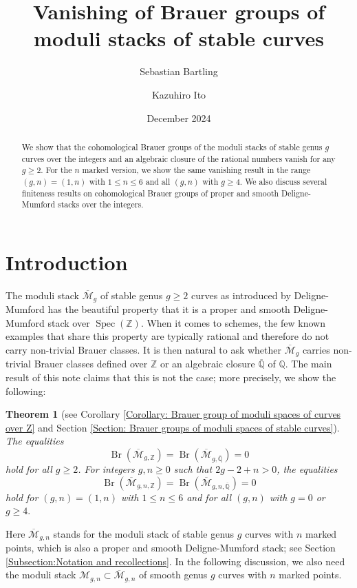 \documentclass{amsart}
\title{Vanishing of Brauer groups of moduli stacks of stable curves}
\author{Sebastian Bartling}
\author{Kazuhiro Ito}
\date{December 2024}
\newtheorem{thm}[prop]{Theorem}
\theoremstyle{definition}
\theoremstyle{remark}
\DeclareMathOperator{\Spec}{Spec}
\DeclareMathOperator{\Br}{Br}
\newcommand{\Q}{\mathbb{Q}}
\newcommand{\ZZ}{\mathbb Z}
\newcommand{\QQ}{\mathbb Q}
\begin{document}
\begin{abstract}
    We show that the cohomological Brauer groups of
    the moduli stacks of stable genus $g$ curves over the integers and an algebraic closure of the rational numbers vanish for any $g\geq 2$.
    For the $n$ marked version, we show the same vanishing result in the range $(g,n)=(1,n)$ with $1\leq n \leq 6$ and all $(g,n)$ with $g\geq 4.$
    We also discuss several finiteness results on cohomological Brauer groups of proper and smooth Deligne-Mumford stacks over the integers.
    \end{abstract}
\maketitle


\section{Introduction}
The moduli stack $\overline{\mathcal{M}}_{g}$ of stable genus $g \geq 2$ curves as introduced by Deligne-Mumford \cite{DeligneMumfordModuliCurves} has the beautiful property that it is a proper and smooth Deligne-Mumford stack over $\Spec(\ZZ)$.
When it comes to schemes, the few known examples that share this property are typically rational and therefore do not carry non-trivial Brauer classes.
It is then natural to ask whether $\overline{\mathcal{M}}_{g}$ carries non-trivial Brauer classes defined over
$\ZZ$
or
an algebraic closure $\overline{\QQ}$ of $\QQ$.
The main result of this note claims that this is not the case; more precisely, we show the following:

\begin{thm}[see Corollary \ref{Corollary: Brauer group of moduli spaces of curves over Z} and Section \ref{Section: Brauer groups of moduli spaces of stable curves}]\label{thm: main result}
The equalities
$$
\Br(\overline{\mathcal{M}}_{g,\ZZ})=\Br(\overline{\mathcal{M}}_{g,\overline{\Q}})=0
$$
hold for all $g\geq 2$.
    For integers $g, n \geq 0$ such that $2g-2+n>0$, the equalities
$$
\Br(\overline{\mathcal{M}}_{g,n,\ZZ})=\Br(\overline{\mathcal{M}}_{g,n,\overline{\Q}})=0
$$
hold for $(g, n)=(1,n)$ with $1\leq n \leq 6$ and for all $(g,n)$ with $g=0$ or $g\geq 4.$
\end{thm}

Here $\overline{\mathcal{M}}_{g, n}$ stands for the moduli stack of stable genus $g$ curves with $n$ marked points, which is also a proper and smooth Deligne-Mumford stack; see Section \ref{Subsection:Notation and recollections}.
In the following discussion, we also need
the moduli stack
$\mathcal{M}_{g, n} \subset \overline{\mathcal{M}}_{g, n}$
of smooth genus $g$ curves with $n$ marked points.
\end{document}
